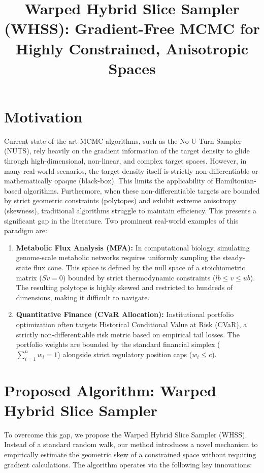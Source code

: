 \documentclass[12pt]{article}
\title{Warped Hybrid Slice Sampler (WHSS): Gradient-Free MCMC for Highly Constrained, Anisotropic Spaces}
\author{}
\date{}
\begin{document}
\maketitle

\section*{Motivation}
Current state-of-the-art MCMC algorithms, such as the No-U-Turn Sampler (NUTS), rely heavily on the gradient information of the target density to glide through high-dimensional, non-linear, and complex target spaces. However, in many real-world scenarios, the target density itself is strictly non-differentiable or mathematically opaque (black-box). This limits the applicability of Hamiltonian-based algorithms. Furthermore, when these non-differentiable targets are bounded by strict geometric constraints (polytopes) and exhibit extreme anisotropy (skewness), traditional algorithms struggle to maintain efficiency. This presents a significant gap in the literature. Two prominent real-world examples of this paradigm are:
\begin{enumerate}
    \item \textbf{Metabolic Flux Analysis (MFA):} In computational biology, simulating genome-scale metabolic networks requires uniformly sampling the steady-state flux cone. This space is defined by the null space of a stoichiometric matrix ($Sv = 0$) bounded by strict thermodynamic constraints ($lb \le v \le ub$). The resulting polytope is highly skewed and restricted to hundreds of dimensions, making it difficult to navigate.
    \item \textbf{Quantitative Finance (CVaR Allocation):} Institutional portfolio optimization often targets Historical Conditional Value at Risk (CVaR), a strictly non-differentiable risk metric based on empirical tail losses. The portfolio weights are bounded by the standard financial simplex ($\sum_{i=1}^n w_i = 1$) alongside strict regulatory position caps ($w_i \le c$).
\end{enumerate}

\section*{Proposed Algorithm: Warped Hybrid Slice Sampler}
To overcome this gap, we propose the Warped Hybrid Slice Sampler (WHSS). Instead of a standard random walk, our method introduces a novel mechanism to empirically estimate the geometric skew of a constrained space without requiring gradient calculations. The algorithm operates via the following key innovations:
\end{document}
